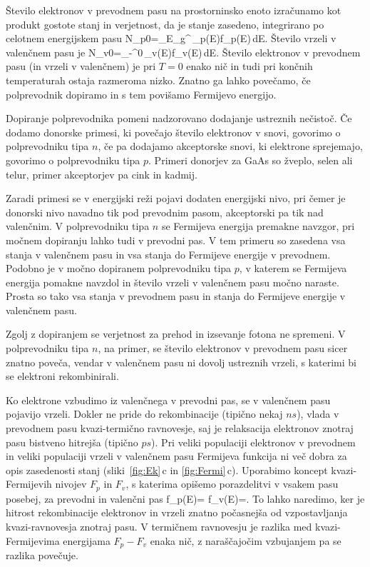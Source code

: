 Število elektronov v prevodnem pasu na prostorninsko enoto izračunamo kot 
produkt gostote stanj in verjetnost, da je stanje zasedeno, integrirano po 
celotnem energijskem pasu
\beq
N_{p0}=\int_{E_g}^{\infty}\,\rho_p(E)f_p(E)\,dE.
\label{6.3a}
\eeq
Število vrzeli v valenčnem pasu je 
\beq
N_{v0}=\int_{-\infty}^{0}\,\rho_v(E)f_v(E)\,dE.
\label{6.3b}
\eeq
Število elektronov v prevodnem pasu (in vrzeli v valenčnem) je pri
$T=0$ enako nič in tudi pri končnih temperaturah ostaja razmeroma nizko. 
Znatno ga lahko povečamo, če polprevodnik dopiramo in s tem povišamo 
Fermijevo energijo.

Dopiranje polprevodnika pomeni nadzorovano dodajanje ustreznih nečistoč. 
Če dodamo donorske primesi, ki povečajo število elektronov v snovi, 
govorimo o polprevodniku tipa $n$, če pa dodajamo akceptorske snovi, ki 
elektrone sprejemajo, govorimo o polprevodniku tipa $p$. 
Primeri donorjev za GaAs so žveplo, selen ali telur,
primer akceptorjev pa cink in kadmij. 

Zaradi primesi se v energijski 
reži pojavi dodaten energijski nivo, pri čemer je donorski nivo navadno 
tik pod prevodnim pasom, akceptorski pa tik nad valenčnim. V polprevodniku tipa $n$ se
Fermijeva energija premakne navzgor, pri močnem dopiranju lahko tudi v 
prevodni pas. V tem primeru so zasedena vsa stanja v valenčnem pasu in vsa
stanja do Fermijeve energije v prevodnem. Podobno je v močno dopiranem polprevodniku tipa 
$p$, v katerem se Fermijeva energija pomakne navzdol in število vrzeli v valenčnem 
pasu močno naraste. Prosta so tako vsa stanja v prevodnem pasu in stanja do 
Fermijeve energije v valenčnem pasu.

\begin{remark}
 Zgolj z dopiranjem se verjetnost za prehod in izsevanje fotona ne spremeni. V
 polprevodniku tipa $n$, na primer, se število elektronov v prevodnem pasu sicer znatno poveča, 
 vendar v valenčnem pasu ni dovolj ustreznih vrzeli, s katerimi bi se elektroni rekombinirali.
\end{remark}

Ko elektrone vzbudimo iz valenčnega v prevodni pas, se v valenčnem pasu pojavijo
vrzeli. Dokler ne pride do rekombinacije (tipično nekaj $\si{ns}$),
vlada v prevodnem pasu kvazi-termično ravnovesje, saj je relaksacija 
elektronov znotraj pasu bistveno hitrejša (tipično $\si{ps}$). 
Pri veliki populaciji elektronov v prevodnem in veliki populaciji vrzeli v 
valenčnem pasu Fermijeva funkcija ni več dobra za opis zasedenosti stanj 
(sliki~\ref{fig:Ek}\,c in \ref{fig:Fermi}\,c). Uporabimo 
koncept kvazi-Fermijevih nivojev $F_p$ in $F_v$, s katerima opišemo porazdelitvi
v vsakem pasu posebej, za prevodni in valenčni pas
\beq
f_p(E)= \quad {} \quad 
f_v(E)=.
\eeq
To lahko naredimo, ker je hitrost rekombinacije elektronov in vrzeli znatno počasnejša
od vzpostavljanja kvazi-ravnovesja znotraj pasu. V termičnem ravnovesju je razlika med 
kvazi-Fermijevima energijama $F_{p}-F_v$ enaka nič, z naraščajočim vzbujanjem pa se 
razlika povečuje.

